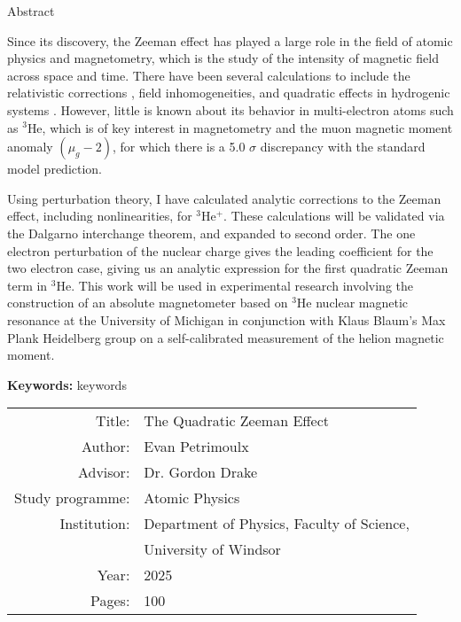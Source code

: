 \documentclass[a4paper,12pt,twoside]{report}
\begin{document}
\pagestyle{empty}

% 

\centerline{\Large Abstract}

\bigskip
\noindent

Since its discovery, the Zeeman effect has played a large role in the field of atomic physics and magnetometry, which is the study of the intensity of magnetic field across space and time. There have been several calculations to include the relativistic corrections \cite{2007Drake-Wu, Drake-Yan}, field inhomogeneities, and quadratic effects in hydrogenic systems \cite{Fontanari_Sadovskií_2015}. However, little is known about its behavior in multi-electron atoms such as $^3$He, which is of key interest in magnetometry and the muon magnetic moment anomaly $(\mu_g - 2)$, for which there is a 5.0 $\sigma$ discrepancy \cite{aguillard2023measurement} with the standard model prediction.

Using perturbation theory, I have calculated analytic corrections to the Zeeman effect, including nonlinearities, for $^3$He$^+$. These calculations will be validated via the Dalgarno interchange theorem, and expanded to second order. The one electron perturbation of the nuclear charge gives the leading coefficient for the two electron case, giving us an analytic expression for the first quadratic Zeeman term in $^3$He. This work will be used in experimental research involving the construction of an absolute magnetometer based on $^3$He nuclear magnetic resonance at the University of Michigan \cite{Farooq_Chupp_Grange_Tewsley-Booth_Flay_Kawall_Sachdeva_Winter_2020} in conjunction with Klaus Blaum's Max Plank Heidelberg group on a self-calibrated measurement of the helion magnetic moment.

\vfil

\noindent\textbf{Keywords:} keywords

\vfil

{\centering
\begin{tabular}{rl}
Title: & The Quadratic Zeeman Effect	\\
Author: & Evan Petrimoulx	\\
Advisor: & Dr. Gordon Drake	\\
Study programme: & Atomic Physics	\\
Institution: & Department of Physics, Faculty of Science,\\
 & University of Windsor	\\
Year: & 2025	\\
Pages: & 100
\end{tabular}
}
\end{document}

